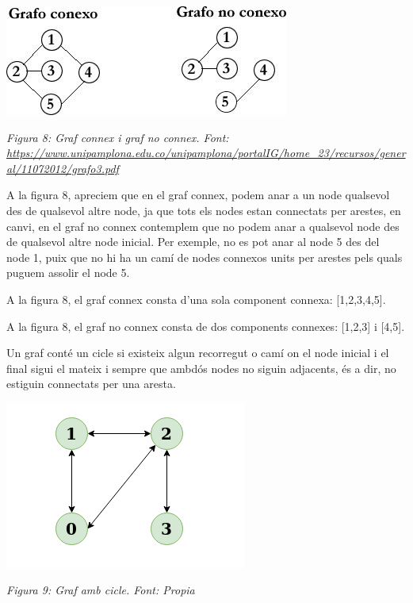 \begin{center}
    \includegraphics[width=.7 \textwidth]{GrafoConexo.jpg}

    \caption{\emph{Figura 8: Graf connex i graf no connex. Font: \url{https://www.unipamplona.edu.co/unipamplona/portalIG/home_23/recursos/general/11072012/grafo3.pdf}}}
\end{center}

\newpage

A la figura 8, apreciem que en el graf connex, podem anar a un node qualsevol des de qualsevol altre node, ja que tots els nodes estan connectats per arestes, en canvi, en el graf no connex contemplem que no podem anar a qualsevol node des de qualsevol altre node inicial. Per exemple, no es pot anar al node 5 des del node 1, puix que no hi ha un camí de nodes connexos units per arestes pels quals puguem assolir el node 5. \newline

A la figura 8, el graf connex consta d'una sola component connexa: [1,2,3,4,5].

A la figura 8, el graf no connex consta de dos components connexes: [1,2,3] i [4,5]. \newline \newline

Un graf conté un cicle si existeix algun recorregut o camí on el node inicial i el final sigui el mateix i sempre que ambdós nodes no siguin adjacents, és a dir, no estiguin connectats per una aresta. \newline

\begin{center}
    \includegraphics[width=.5 \textwidth]{GrafCicle.png}

    \caption{\emph{Figura 9: Graf amb cicle. Font: Propia}}
\end{center}

